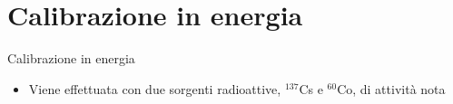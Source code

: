 \documentclass [xcolor=svgnames, 9pt] {beamer}
\begin{document}
\section{Calibrazione in energia}
\begin{frame}{Calibrazione in energia}
	\begin{itemize}
		\item Viene effettuata con due sorgenti radioattive, $^{137}$Cs e $^{60}$Co, di attività nota
	\end{itemize}
	
	\vspace{3mm} %
	

\end{frame}
\end{document}
